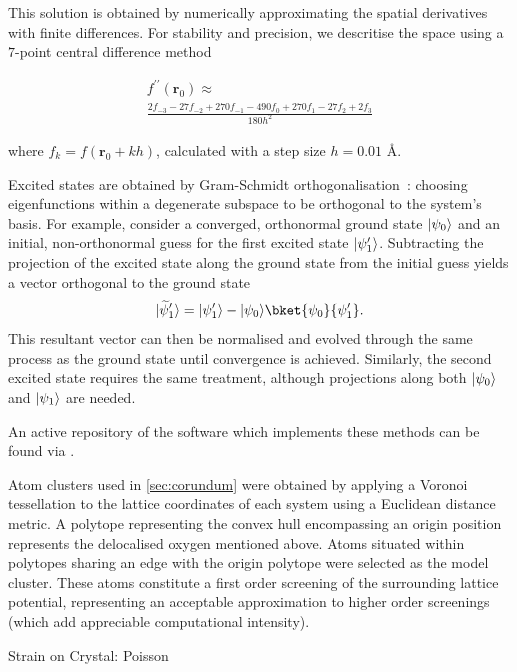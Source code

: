 This solution is obtained by numerically approximating the spatial derivatives with finite differences.
For stability and precision, we descritise the space using a $7$-point central difference method

\begin{multline}
f^{\prime\prime}(\mathbf{r}_0)\approx\\
\frac{2f_{-3}-27f_{-2}+270f_{-1}-490f_{0}+270f_{1}-27f_{2}+2f_{3}}{180h^{2}}
\end{multline}

where $f_k=f\left(\mathbf{r}_0+kh\right)$, calculated with a step size $h=0.01$ \AA. %

Excited states are obtained by Gram-Schmidt orthogonalisation~\cite{Gram1883, Schmidt1907}: choosing eigenfunctions within a degenerate subspace to be orthogonal to the system's basis.
For example, consider a converged, orthonormal ground state $\lvert\psi_0\rangle$ and an initial, non-orthonormal guess for the first excited state $\lvert\psi^\prime_1\rangle$.
Subtracting the projection of the excited state along the ground state from the initial guess yields a vector orthogonal to the ground state
\begin{equation}
\lvert\widetilde{\psi}^\prime_1\rangle = \ket{\psi^\prime_1}-\ket{\psi_0}\bket{\psi_0}{\psi^\prime_1}.
\end{equation}
This resultant vector can then be normalised and evolved through the same process as the ground state until convergence is achieved.
Similarly, the second excited state requires the same treatment, although projections along both $\lvert\psi_0\rangle$ and $\lvert\psi_1\rangle$ are needed.

An active repository of the software which implements these methods can be found via .

Atom clusters used in \cref{sec:corundum} were obtained by applying a Voronoi tessellation\cite{Voronoi1908} to the lattice coordinates of each system using a Euclidean distance metric.
A polytope representing the convex hull encompassing an origin position represents the delocalised oxygen mentioned above.
Atoms situated within polytopes sharing an edge with the origin polytope were selected as the model cluster.
These atoms constitute a first order screening of the surrounding lattice potential, representing an acceptable approximation to higher order screenings (which add appreciable computational intensity).


Strain on Crystal:
Poisson \cite{Poisson1829}

